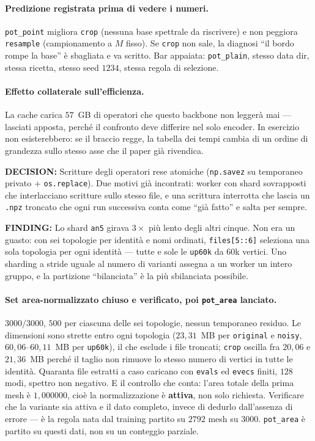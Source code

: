\documentclass[11pt,a4paper]{article}
\newcommand{\finding}[1]{\textcolor{finding}{\textbf{FINDING:}} #1}
\newcommand{\decision}[1]{\textcolor{decision}{\textbf{DECISION:}} #1}
\begin{document}
\paragraph{Predizione registrata prima di vedere i numeri.} \texttt{pot\_point} migliora
\texttt{crop} (nessuna base spettrale da riscrivere) e non peggiora \texttt{resample}
(campionamento a $M$ fisso). Se \texttt{crop} non sale, la diagnosi ``il bordo rompe la base''
\`e sbagliata e va scritto. Bar appaiata: \texttt{pot\_plain}, stesso data dir, stessa ricetta,
stesso seed $1234$, stessa regola di selezione.

\paragraph{Effetto collaterale sull'efficienza.} La cache carica $57$~GB di operatori che questo
backbone non legger\`a mai --- lasciati apposta, perch\'e il confronto deve differire nel solo
encoder. In esercizio non esisterebbero: se il braccio regge, la tabella dei tempi cambia di un
ordine di grandezza sullo stesso asse che il paper gi\`a rivendica.

\decision{Scritture degli operatori rese atomiche (\texttt{np.savez} su temporaneo privato
$+$ \texttt{os.replace}). Due motivi gi\`a incontrati: worker con shard sovrapposti che
interlacciano scritture sullo stesso file, e una scrittura interrotta che lascia un
\texttt{.npz} troncato che ogni run successiva conta come ``gi\`a fatto'' e salta per sempre.}

\finding{Lo shard \texttt{an5} girava $3\times$ pi\`u lento degli altri cinque. Non era un
guasto: con sei topologie per identit\`a e nomi ordinati, \texttt{files[5::6]} seleziona una
sola topologia per ogni identit\`a --- tutte e sole le \texttt{up60k} da $60$k vertici.
Uno sharding a stride uguale al numero di varianti assegna a un worker un intero gruppo, e la
partizione ``bilanciata'' \`e la pi\`u sbilanciata possibile.}


\paragraph{Set area-normalizzato chiuso e verificato, poi \texttt{pot\_area} lanciato.}
$3000/3000$, $500$ per ciascuna delle sei topologie, nessun temporaneo residuo. Le dimensioni
sono strette entro ogni topologia ($23{,}31$~MB per \texttt{original} e \texttt{noisy},
$60{,}06$--$60{,}11$~MB per \texttt{up60k}), il che esclude i file troncati; \texttt{crop}
oscilla fra $20{,}06$ e $21{,}36$~MB perch\'e il taglio non rimuove lo stesso numero di
vertici in tutte le identit\`a. Quaranta file estratti a caso caricano con \texttt{evals} ed
\texttt{evecs} finiti, $128$ modi, spettro non negativo. E il controllo che conta: l'area
totale della prima mesh \`e $1{,}000000$, cio\`e la normalizzazione \`e \textbf{attiva}, non
solo richiesta. Verificare che la variante sia attiva e il dato completo, invece di dedurlo
dall'assenza di errore --- \`e la regola nata dal training partito su $2792$ mesh su $3000$.
\texttt{pot\_area} \`e partito su questi dati, non su un conteggio parziale.
\end{document}
